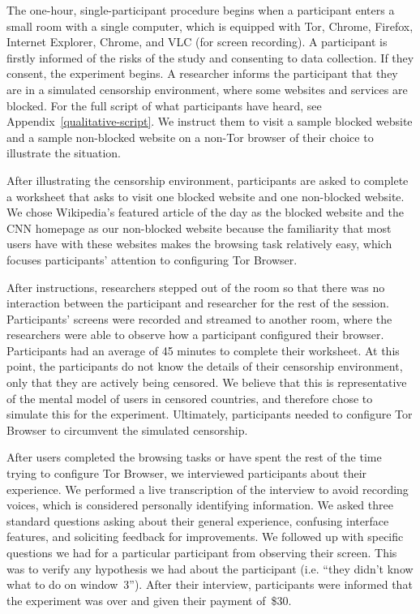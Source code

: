 \documentclass[USenglish,oneside,twocolumn]{article}
\begin{document}
The one-hour, single-participant procedure begins when a participant enters a small 
room with a single computer, which is equipped with Tor, Chrome, Firefox, Internet Explorer, 
Chrome, and VLC (for screen recording). A participant is firstly informed of 
the risks of the study and consenting to data collection. If they consent, the 
experiment begins. A researcher informs the participant that they are in a
simulated censorship environment, where some websites and services are blocked. 
For the full script of what participants have heard, see Appendix~\ref{qualitative-script}. We
instruct them to visit a sample blocked website and a sample non-blocked website on a
non-Tor browser of their choice to illustrate the situation.

After illustrating the censorship environment, participants are asked to 
complete a worksheet that asks to visit one blocked website and one non-blocked website. 
We chose Wikipedia's featured article of the day as the blocked website and 
the CNN homepage as our non-blocked website because the familiarity 
that most users have with these websites makes the browsing task relatively easy, 
which focuses participants' attention to configuring Tor Browser. 

After instructions, researchers stepped out of the room so that there was no interaction
between the participant and researcher for the rest of the session. Participants' screens 
were recorded and streamed to another room, where the researchers were able to 
observe how a participant configured their browser. Participants had an 
average of 45 minutes to complete their worksheet. 
At this point, the participants do not know the details of their censorship environment,
only that they are actively being censored. We believe that this is representative 
of the mental model of users in censored countries, and therefore chose to simulate 
this for the experiment. Ultimately, participants needed to configure Tor Browser to 
circumvent the simulated censorship. 

After users completed the browsing tasks or have spent the rest of the time
trying to configure Tor Browser, we interviewed participants about their experience.
We performed a live transcription of the interview to avoid recording voices, which is
considered personally identifying information. 
We asked three standard questions asking about their general experience, 
confusing interface features, and soliciting feedback for improvements. We followed up
with specific questions we had for a particular participant from observing their screen. 
This was to verify any hypothesis we had about the participant (i.e. ``they didn't know what to do on window~3'').  
After their interview, participants were informed that the experiment was over and 
given their payment of~\$30. 
\end{document}

